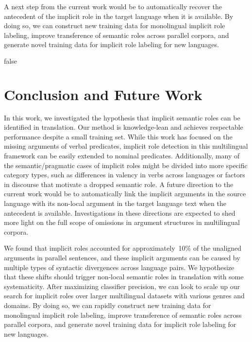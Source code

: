\documentclass[11pt]{article}
\begin{document}
A next step from the current work would be to automatically recover the antecedent of the implicit role in the target language when it is available. 
By doing so, we can construct new training data for monolingual implicit role labeling, improve transference of semantic roles across parallel corpora, and generate novel training data for implicit role labeling for new languages.

\if false
\section{Conclusion and Future Work}
In this work, we investigated the hypothesis that implicit semantic roles can be identified in translation. Our method is knowledge-lean and achieves respectable performance despite a small training set.
While this work has focused on the missing arguments of verbal predicates, implicit role detection in this multilingual framework can be easily extended to nominal predicates. Additionally, many of the semantic/pragmatic cases of implicit roles might be divided into more specific category types, such as differences in valency in verbs across languages or factors in discourse that motivate a dropped semantic role. A future direction to the current work would be to automatically link the implicit arguments in the source language with its non-local argument in the target language text when the antecedent is available. Investigations in these directions are expected to shed more light on the full scope of omissions in argument structures in multilingual corpora.

We found that implicit roles accounted for approximately\ 10{\%} of the unaligned arguments in parallel sentences, and these implicit arguments can be caused by multiple types of syntactic divergences across language pairs. We hypothesize that these shifts should trigger non-local semantic roles in translation with some systematicity. After maximizing classifier precision, we can look to scale up our search for implicit roles over larger multilingual datasets with various genres and domains. By doing so, we can rapidly construct new training data for monolingual implicit role labeling, improve transference of semantic roles across parallel corpora, and generate novel training data for implicit role labeling for new languages.
\end{document}
